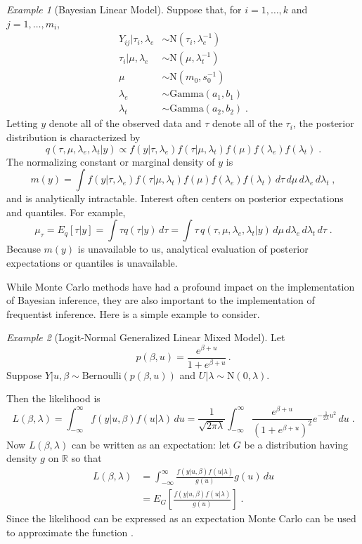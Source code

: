 \documentclass[12pt]{article}
\theoremstyle{plain}
\theoremstyle{definition}
\theoremstyle{remark}
\newtheorem{example}{Example}[section]
\begin{document}
\begin{example}[Bayesian Linear Model]
Suppose that, for $i=1,\ldots,k$ and $j=1,\ldots,m_i$,
\begin{align*}
Y_{ij} | \tau_i, \lambda_e & \sim \text{N}(\tau_{i}, \lambda_e^{-1})\\
\tau_{i} | \mu, \lambda_e & \sim \text{N}(\mu, \lambda_t^{-1})\\
\mu &\sim \text{N}(m_0, s_0^{-1}) \\
\lambda_e &\sim \text{Gamma}(a_1,
b_1) \\
\lambda_{t} &\sim \text{Gamma}(a_2, b_2) \; .
\end{align*}
Letting $y$ denote all of the observed data and $\tau$ denote all of the
$\tau_i$, the posterior distribution is characterized by
\[
q(\tau, \mu, \lambda_e, \lambda_t | y) \propto f(y|\tau,
\lambda_e) f(\tau | \mu, \lambda_t) f(\mu) f(\lambda_e) f(\lambda_t)
\; .
\]
The normalizing constant or marginal density of $y$ is
\[
m(y) = \int f(y|\tau,
\lambda_e) f(\tau | \mu, \lambda_t) f(\mu) f(\lambda_e) f(\lambda_t)\,
d\tau\, d\mu\, d\lambda_e \, d\lambda_t \; ,
\]
and is analytically intractable. Interest often centers on posterior
expectations and quantiles.  For example,
\[
\mu_{\tau}=E_q[\tau |y] = \int \tau q(\tau | y)\,d\tau = \int \tau \, q(\tau, \mu, \lambda_e,
\lambda_t |y) \, d\mu \, d\lambda_e \, d\lambda_t \, d\tau \; .
\]
Because $m(y)$ is unavailable to us, analytical evaluation of
posterior expectations or quantiles is unavailable.
\end{example} 

While Monte Carlo methods have had a profound impact on the
implementation of Bayesian inference, they are also important to
the implementation of frequentist inference.  Here is a simple example
to consider.

\begin{example}[Logit-Normal Generalized Linear Mixed Model]
Let
\[
p(\beta, u) = \frac{e^{\beta + u}}{1 + e^{\beta + u}}\, .
\]
Suppose $Y | u, \beta \sim \text{Bernoulli}(p(\beta, u))$ and $U|\lambda
\sim \text{N}(0, \lambda)$.

Then the likelihood is
$$
L(\beta, \lambda)  = \int_{-\infty}^{\infty} f(y|u, \beta) f(u | \lambda) \, du 
 =\frac{1}{\sqrt{2 \pi \lambda}} \int_{-\infty}^{\infty}
\frac{e^{\beta + u}}{(1 + e^{\beta + u})^2} e^{- \frac{1}{2\lambda}
  u^2}\, du \; .
$$
Now $L(\beta, \lambda)$ can be written as an expectation: let $G$ be
a distribution having density $g$ on $\mathbb{R}$ so that
\[
\begin{split}
L(\beta, \lambda) & = \int_{-\infty}^{\infty} \frac{f(y|u, \beta) f(u
  | \lambda)}{g(u)} g(u) \, du \\
& = E_{G}\left[  \frac{f(y|u, \beta) f(u
  | \lambda)}{g(u)} \right] \; .
\end{split}
\]
Since the likelihood can be expressed as an expectation Monte Carlo
can be used to approximate the function \cite{geye:1994}.

\end{example}
\end{document}
